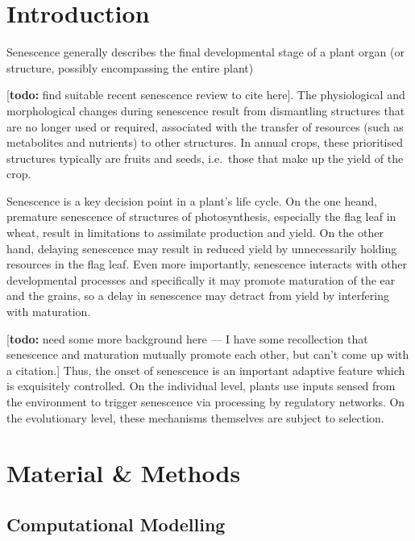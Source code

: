 \documentclass{frontiersSCNS} %
\newcommand{\todo}[1]{
  \rule{0pt}{0pt}\marginpar{{\color{blue}\rule{1ex}{1ex}}}
  {[\textbf{\color{blue}todo:} #1]}}
\begin{document}
\section{Introduction}

%
%
Senescence generally describes the final developmental stage of a
plant organ (or structure, possibly encompassing the entire plant)
\todo{find suitable recent senescence review to cite here}. The
physiological and morphological changes during senescence result from
dismantling structures that are no longer used or required, associated
with the transfer of resources (such as metabolites and nutrients) to
other structures. In annual crops, these prioritised structures
typically are fruits and seeds, i.e.\ those that make up the yield of
the crop.

Senescence is a key decision point in a plant's life cycle. On the one
heand, premature senescence of structures of photosynthesis,
especially the flag leaf in wheat, result in limitations to assimilate
production and yield. On the other hand, delaying senescence may
result in reduced yield by unnecessarily holding resources in the flag
leaf. Even more importantly, senescence interacts with other
developmental processes and specifically it may promote maturation of
the ear and the grains, so a delay in senescence may detract from
yield by interfering with maturation. \todo{need some more background
  here --- I have some recollection that senescence and maturation
  mutually promote each other, but can't come up with a citation.}
Thus, the onset of senescence is an important adaptive feature which
is exquisitely controlled. On the individual level, plants use inputs
sensed from the environment to trigger senescence via processing by
regulatory networks. On the evolutionary level, these mechanisms
themselves are subject to selection.


\section{Material \& Methods}

\subsection{Computational Modelling}
\end{document}

